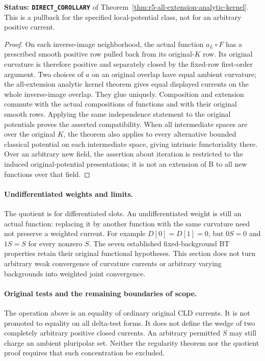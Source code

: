 \documentclass[11pt,a4paper]{article}
\numberwithin{equation}{section}
\theoremstyle{definition}
\theoremstyle{remark}
\begin{document}
\noindent\textbf{Status: \texttt{DIRECT\_COROLLARY}} of
Theorem~\ref{thm:r5-all-extension-analytic-kernel}.
This is a pullback for the specified local-potential class,
not for an arbitrary positive current.

\begin{proof}
On each inverse-image neighborhood, the actual function
$a_L\circ F$ has a prescribed smooth positive row pulled
back from its original-$K$ row. Its original curvature is
therefore positive and separately closed by the fixed-row
first-order argument. Two choices of $a$ on an original
overlap have equal ambient curvature; the all-extension
analytic kernel theorem gives equal displayed currents on
the whole inverse-image overlap. They glue uniquely.
Composition and extension commute with the actual
compositions of functions and with their original smooth
rows. Applying the same independence statement to the
original potentials proves the asserted compatibility.
When all intermediate spaces are over the original $K$,
the theorem also applies to every alternative bounded
classical potential on each intermediate space, giving
intrinsic functoriality there. Over an arbitrary new field,
the assertion about iteration is restricted to the induced
original-potential presentations; it is not an extension
of B to all new functions over that field.
\end{proof}

\paragraph{Undifferentiated weights and limits.}
The quotient is for differentiated slots. An undifferentiated
weight is still an actual function: replacing it by another
function with the same curvature need not preserve a weighted
current. For example $D[0]=D[1]=0$, but $0S=0$ and $1S=S$
for every nonzero $S$. The seven established fixed-background
BT properties retain their original functional hypotheses.
This section does not turn arbitrary weak convergence of
curvature currents or arbitrary varying backgrounds into
weighted joint convergence.

\paragraph{Original tests and the remaining boundaries of scope.}
The operation above is an equality of ordinary original
CLD currents. It is not promoted to equality on all delta-test
forms. It does not define the wedge of two completely arbitrary
positive closed currents. An arbitrary permitted $S$ may still
charge an ambient pluripolar set. Neither the regularity
theorem nor the quotient proof requires that such concentration
be excluded.
\end{document}
